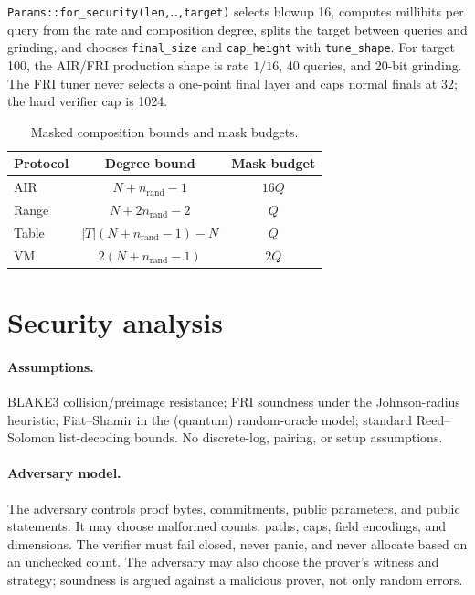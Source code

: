 \documentclass[11pt,a4paper]{article}
\begin{document}
\texttt{Params::for\_security(len,\dots,target)} selects blowup 16, computes
millibits per query from the rate and composition degree, splits the target
between queries and grinding, and chooses \texttt{final\_size} and
\texttt{cap\_height} with \texttt{tune\_shape}. For target 100, the
AIR/FRI production shape is rate $1/16$, 40 queries, and 20-bit grinding.
The FRI tuner never selects a one-point final layer and caps normal finals at
32; the hard verifier cap is 1024.

\begin{table}[h]
\centering
\small
\begin{tabular}{@{}lcc@{}}
\toprule
Protocol & Degree bound & Mask budget \\
\midrule
AIR & $N+n_{\mathrm{rand}}-1$ & $16Q$ \\
Range & $N+2n_{\mathrm{rand}}-2$ & $Q$ \\
Table & $|T|(N+n_{\mathrm{rand}}-1)-N$ & $Q$ \\
VM & $2(N+n_{\mathrm{rand}}-1)$ & $2Q$ \\
\bottomrule
\end{tabular}
\caption{Masked composition bounds and mask budgets.}
\end{table}

\section{Security analysis}

\paragraph{Assumptions.} BLAKE3 collision/preimage resistance; FRI soundness
under the Johnson-radius heuristic; Fiat--Shamir in the (quantum)
random-oracle model; standard Reed--Solomon list-decoding bounds. No
discrete-log, pairing, or setup assumptions.

\paragraph{Adversary model.} The adversary controls proof bytes, commitments,
public parameters, and public statements. It may choose malformed counts,
paths, caps, field encodings, and dimensions. The verifier must fail closed,
never panic, and never allocate based on an unchecked count. The adversary may
also choose the prover's witness and strategy; soundness is argued against a
malicious prover, not only random errors.
\end{document}
